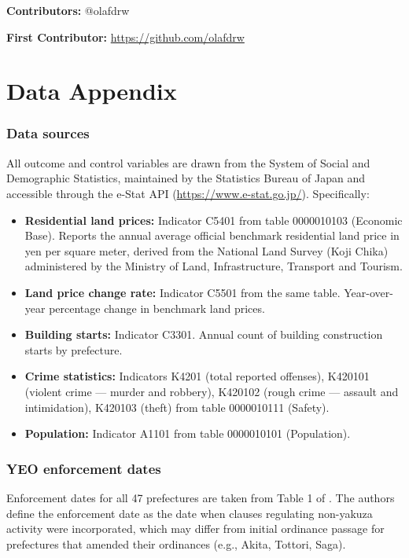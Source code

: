 \documentclass[12pt]{article}
\begin{document}
\noindent\textbf{Contributors:} @olafdrw

\noindent\textbf{First Contributor:} \url{https://github.com/olafdrw}

\label{apep_main_text_end}
\newpage


\newpage
\appendix

\section{Data Appendix}

\subsubsection*{Data sources} All outcome and control variables are drawn from the System of Social and Demographic Statistics, maintained by the Statistics Bureau of Japan and accessible through the e-Stat API (\url{https://www.e-stat.go.jp/}). Specifically:

\begin{itemize}
  \item \textbf{Residential land prices:} Indicator C5401 from table 0000010103 (Economic Base). Reports the annual average official benchmark residential land price in yen per square meter, derived from the National Land Survey (Koji Chika) administered by the Ministry of Land, Infrastructure, Transport and Tourism.
  \item \textbf{Land price change rate:} Indicator C5501 from the same table. Year-over-year percentage change in benchmark land prices.
  \item \textbf{Building starts:} Indicator C3301. Annual count of building construction starts by prefecture.
  \item \textbf{Crime statistics:} Indicators K4201 (total reported offenses), K420101 (violent crime --- murder and robbery), K420102 (rough crime --- assault and intimidation), K420103 (theft) from table 0000010111 (Safety).
  \item \textbf{Population:} Indicator A1101 from table 0000010101 (Population).
\end{itemize}

\subsubsection*{YEO enforcement dates} Enforcement dates for all 47 prefectures are taken from Table 1 of \citet{hoshino2020containing}. The authors define the enforcement date as the date when clauses regulating non-yakuza activity were incorporated, which may differ from initial ordinance passage for prefectures that amended their ordinances (e.g., Akita, Tottori, Saga).
\end{document}

